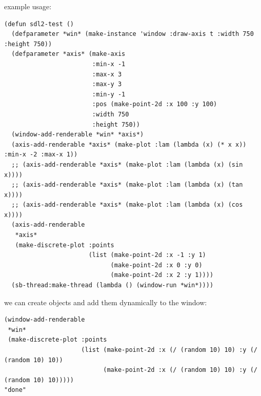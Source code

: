 \documentclass[a4paper,12pt]{article}
\begin{document}
example usage:\\
\lstset{language=Lisp,label= ,caption= ,captionpos=b,numbers=none}
\begin{lstlisting}
(defun sdl2-test ()
  (defparameter *win* (make-instance 'window :draw-axis t :width 750 :height 750))
  (defparameter *axis* (make-axis
                        :min-x -1
                        :max-x 3
                        :max-y 3
                        :min-y -1
                        :pos (make-point-2d :x 100 :y 100)
                        :width 750
                        :height 750))
  (window-add-renderable *win* *axis*)
  (axis-add-renderable *axis* (make-plot :lam (lambda (x) (* x x)) :min-x -2 :max-x 1))
  ;; (axis-add-renderable *axis* (make-plot :lam (lambda (x) (sin x))))
  ;; (axis-add-renderable *axis* (make-plot :lam (lambda (x) (tan x))))
  ;; (axis-add-renderable *axis* (make-plot :lam (lambda (x) (cos x))))
  (axis-add-renderable
   *axis*
   (make-discrete-plot :points
                       (list (make-point-2d :x -1 :y 1)
                             (make-point-2d :x 0 :y 0)
                             (make-point-2d :x 2 :y 1))))
  (sb-thread:make-thread (lambda () (window-run *win*))))
\end{lstlisting}
we can create objects and add them dynamically to the window:\\
\lstset{language=Lisp,label= ,caption= ,captionpos=b,numbers=none}
\begin{lstlisting}
(window-add-renderable
 *win*
 (make-discrete-plot :points
                     (list (make-point-2d :x (/ (random 10) 10) :y (/ (random 10) 10))
                           (make-point-2d :x (/ (random 10) 10) :y (/ (random 10) 10)))))
"done"
\end{lstlisting}
\end{document}
